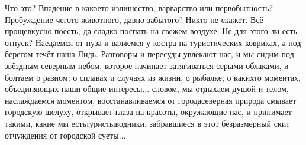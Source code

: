 Что это? Впадение в какое\sdash то излишество, варварство или первобытность? Пробуждение чего\sdash то животного, давно забытого? Никто не скажет. Всё проще\mdash вкусно поесть, да сладко поспать на свежем воздухе. Не для этого ли есть отпуск? Наедаемся от пуза и валяемся у костра на туристических ковриках, а под берегом течёт наша Лидь. Разговоры и пересуды увлекают нас, и мы сидим под звёздным северным небом, которое начинает затягиваться серыми облаками, и болтаем о разном; о сплавах и случаях из жизни, о рыбалке, о каких\sdash то моментах, объединяющих наши общие интересы$\ldots$ словом, мы отдыхаем душой и телом, наслаждаемся моментом, восстанавливаемся от города\mdash северная природа смывает городскую шелуху, открывает глаза на красоты, окружающие нас, и принимает такими, какие мы есть\mdash туристы\sdash водники, забравшиеся в этот безразмерный скит отчуждения от городской суеты$\ldots$ 

\begin{center}
\end{center}
